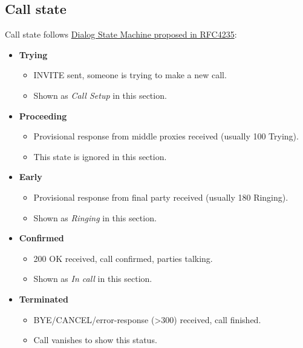 \documentclass[letterpaper,10pt,spanish]{sphinxmanual}
\begin{document}
\subsection{Call state}
\label{administration_portal/platform/active_calls:id2}
Call state follows \href{https://tools.ietf.org/html/rfc4235\#section-3.7.1}{Dialog State Machine proposed in RFC4235}:
\begin{itemize}
\item {} 
\textbf{Trying}
\begin{itemize}
\item {} 
INVITE sent, someone is trying to make a new call.

\item {} 
Shown as \emph{Call Setup} in this section.

\end{itemize}

\item {} 
\textbf{Proceeding}
\begin{itemize}
\item {} 
Provisional response from middle proxies received (usually 100 Trying).

\item {} 
This state is ignored in this section.

\end{itemize}

\item {} 
\textbf{Early}
\begin{itemize}
\item {} 
Provisional response from final party received (usually 180 Ringing).

\item {} 
Shown as \emph{Ringing} in this section.

\end{itemize}

\item {} 
\textbf{Confirmed}
\begin{itemize}
\item {} 
200 OK received, call confirmed, parties talking.

\item {} 
Shown as \emph{In call} in this section.

\end{itemize}

\item {} 
\textbf{Terminated}
\begin{itemize}
\item {} 
BYE/CANCEL/error-response (\textgreater{}300) received, call finished.

\item {} 
Call vanishes to show this status.

\end{itemize}

\end{itemize}
\end{document}
